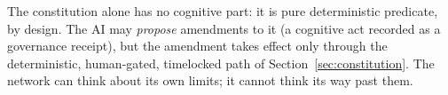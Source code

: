The constitution alone has no cognitive part: it is pure deterministic predicate, by design. The AI may \emph{propose} amendments to it (a cognitive act recorded as a governance receipt), but the amendment takes effect only through the deterministic, human-gated, timelocked path of Section~\ref{sec:constitution}. The network can think about its own limits; it cannot think its way past them.

